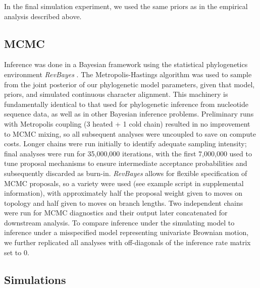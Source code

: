In the final simulation experiment, we used the same priors as in the empirical analysis described above.

\subsection{MCMC}

Inference was done in a Bayesian framework using the statistical phylogenetics environment \textit{RevBayes} \citep{hohnaRevBayesBayesianPhylogenetic2016a}. The Metropolis-Hastings algorithm \citep{hastingsMonteCarloSampling1970} was used to sample from the joint posterior of our phylogenetic model parameters, given that model, priors, and simulated continuous character alignment. This machinery is fundamentally identical to that used for phylogenetic inference from nucleotide sequence data, as well as in other Bayesian inference problems. Preliminary runs with Metropolis coupling (3 heated + 1 cold chain) resulted in no improvement to MCMC mixing, so all subsequent analyses were uncoupled to save on compute costs. Longer chains were run initially to identify adequate sampling intensity; final analyses were run for 35,000,000 iterations, with the first 7,000,000 used to tune proposal mechanisms to ensure intermediate acceptance probabilities and subsequently discarded as burn-in. \textit{RevBayes} allows for flexible specification of MCMC proposals, so a variety were used (see example script in supplemental information), with approximately half the proposal weight given to moves on topology and half given to moves on branch lengths. Two independent chains were run for MCMC diagnostics and their output later concatenated for downstream analysis. To compare inference under the simulating model to inference under a misspecified model representing univariate Brownian motion, we further replicated all analyses with off-diagonals of the inference rate matrix set to 0.

\subsection{Simulations}

